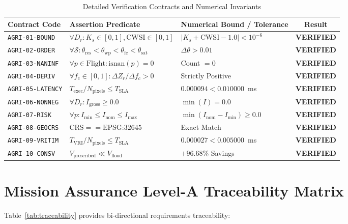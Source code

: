 \documentclass[11pt,a4paper]{article}
\theoremstyle{definition}
\theoremstyle{remark}
\begin{document}
\begin{table}[htbp]
\centering
\caption{Detailed Verification Contracts and Numerical Invariants}
\label{tab:contracts_deep}
\small
\begin{tabular}{lllc}
\toprule
\textbf{Contract Code} & \textbf{Assertion Predicate} & \textbf{Numerical Bound / Tolerance} & \textbf{Result} \\
\midrule
\texttt{AGRI-01-BOUND}  & $\forall D_r: K_s \in [0, 1], \text{CWSI} \in [0, 1]$ & $|K_s + \text{CWSI} - 1.0| < 10^{-6}$ & \textbf{VERIFIED} \\
\texttt{AGRI-02-ORDER}  & $\forall \mathcal{S}: \theta_{\text{res}} < \theta_{\text{wp}} < \theta_{\text{fc}} < \theta_{\text{sat}}$ & $\Delta \theta > 0.01$ & \textbf{VERIFIED} \\
\texttt{AGRI-03-NANINF} & $\forall p \in \text{Flight}: \text{isnan}(p) = 0$ & Count $= 0$ & \textbf{VERIFIED} \\
\texttt{AGRI-04-DERIV}  & $\forall f_c \in [0, 1]: \Delta Z_r / \Delta f_c > 0$ & Strictly Positive & \textbf{VERIFIED} \\
\texttt{AGRI-05-LATENCY}& $T_{\text{exec}} / N_{\text{pixels}} \le T_{\text{SLA}}$ & $0.000094 < 0.010000$~ms & \textbf{VERIFIED} \\
\texttt{AGRI-06-NONNEG} & $\forall D_r: I_{\text{gross}} \ge 0.0$ & $\min(I) = 0.0$ & \textbf{VERIFIED} \\
\texttt{AGRI-07-RISK}   & $\forall p: I_{\min} \le I_{\text{nom}} \le I_{\max}$ & $\min(I_{\text{nom}} - I_{\min}) \ge 0.0$ & \textbf{VERIFIED} \\
\texttt{AGRI-08-GEOCRS} & $\text{CRS} == \text{EPSG:32645}$ & Exact Match & \textbf{VERIFIED} \\
\texttt{AGRI-09-VRITIM} & $T_{\text{VRI}} / N_{\text{pixels}} \le T_{\text{SLA}}$ & $0.000027 < 0.005000$~ms & \textbf{VERIFIED} \\
\texttt{AGRI-10-CONSV}  & $V_{\text{prescribed}} \ll V_{\text{flood}}$ & $+96.68\%$ Savings & \textbf{VERIFIED} \\
\bottomrule
\end{tabular}
\end{table}


\section{Mission Assurance Level-A Traceability Matrix}

Table~\ref{tab:traceability} provides bi-directional requirements traceability:
\end{document}
